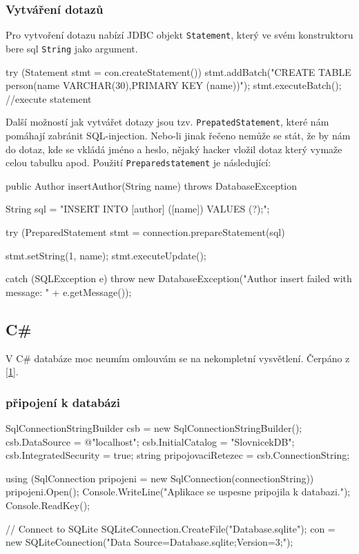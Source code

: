 \documentclass[10pt,a4paper]{article}
\begin{document}
	\subsubsection{Vytváření dotazů}	
	Pro vytvoření dotazu nabízí JDBC objekt \texttt{Statement}, který ve svém konstruktoru bere  sql \texttt{String} jako argument.
\begin{Java}
try (Statement stmt = con.createStatement()){
   stmt.addBatch("CREATE TABLE person(name  VARCHAR(30),PRIMARY KEY (name))");
   stmt.executeBatch(); //execute statement
}
\end{Java}
Další možností jak vytvářet dotazy jsou tzv. \texttt{PrepatedStatement}, které nám pomáhají zabránit SQL-injection. Nebo-li jinak řečeno nemůže se stát, že by nám do dotaz, kde se vkládá jméno a heslo, nějaký hacker vložil dotaz který vymaže celou tabulku apod. Použití \texttt{Preparedstatement} je následující:
\begin{Java}
public Author insertAuthor(String name) throws DatabaseException {
String sql = "INSERT INTO [author] ([name]) VALUES (?);";
         
 try (PreparedStatement stmt =  connection.prepareStatement(sql) {
    stmt.setString(1, name);
    stmt.executeUpdate();
             
  } catch (SQLException e) {
      throw new DatabaseException("Author insert failed with message: " 
	+ e.getMessage());
  }
}
\end{Java}

\subsection{C\#}
V C\# databáze moc neumím omlouvám se na nekompletní vysvětlení. Čerpáno z \href{http://www.itnetwork.cz/c-sharp-tutorial-pripojena-databazova-aplikace}{[1]}.
	\subsubsection{připojení k databázi}
\begin{CS}
SqlConnectionStringBuilder csb = new SqlConnectionStringBuilder();
csb.DataSource = @"localhost\SQLEXPRESS";
csb.InitialCatalog = "SlovnicekDB";
csb.IntegratedSecurity = true;
string pripojovaciRetezec = csb.ConnectionString;

using (SqlConnection pripojeni = new SqlConnection(connectionString))
{
        pripojeni.Open();
        Console.WriteLine("Aplikace se uspesne pripojila k databazi.");
}
Console.ReadKey();

// Connect to SQLite
SQLiteConnection.CreateFile("Database.sqlite");
con = new SQLiteConnection("Data Source=Database.sqlite;Version=3;");
\end{CS}
\end{document}
